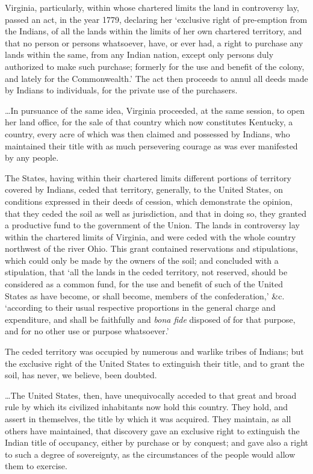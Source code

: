 Virginia, particularly, within whose chartered limits the land in controversy
lay, passed an act, in the year 1779, declaring her `exclusive right of
pre-emption from the Indians, of all the lands within the limits of her own
chartered territory, and that no person or persons whatsoever, have, or ever
had, a right to purchase any lands within the same, from any Indian nation,
except only persons duly authorized to make such purchase; formerly for the use
and benefit of the colony, and lately for the Commonwealth.' The act then
proceeds to annul all deeds made by Indians to individuals, for the private use
of the purchasers.

\ldots In pursuance of the same idea, Virginia proceeded, at the same session,
to open her land office, for the sale of that country which now constitutes
Kentucky, a country, every acre of which was then claimed and possessed by
Indians, who maintained their title with as much persevering courage as was ever
manifested by any people.

The States, having within their chartered limits different portions of territory
covered by Indians, ceded that territory, generally, to the United States, on
conditions expressed in their deeds of cession, which demonstrate the opinion,
that they ceded the soil as well as jurisdiction, and that in doing so, they
granted a productive fund to the government of the Union. The lands in
controversy lay within the chartered limits of Virginia, and were ceded with the
whole country northwest of the river Ohio. This grant contained reservations and
stipulations, which could only be made by the owners of the soil; and concluded
with a stipulation, that `all the lands in the ceded territory, not reserved,
should be considered as a common fund, for the use and benefit of such of the
United States as have become, or shall become, members of the confederation,'
\&c. `according to their usual respective proportions in the general charge and
expenditure, and shall be faithfully and \textit{bona fide} disposed of for that
purpose, and for no other use or purpose whatsoever.'

The ceded territory was occupied by numerous and warlike tribes of Indians; but
the exclusive right of the United States to extinguish their title, and to grant
the soil, has never, we believe, been doubted.

\ldots The United States, then, have unequivocally acceded to that great and
broad rule by which its civilized inhabitants now hold this country. They hold,
and assert in themselves, the title by which it was acquired. They maintain, as
all others have maintained, that discovery gave an exclusive right to extinguish
the Indian title of occupancy, either by purchase or by conquest; and gave also
a right to such a degree of sovereignty, as the circumstances of the people
would allow them to exercise.

